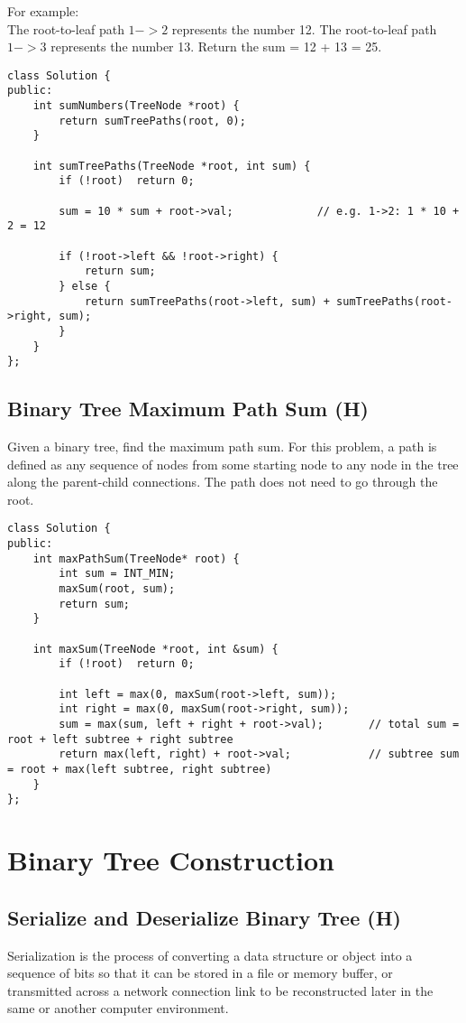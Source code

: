 For example: \\
The root-to-leaf path $1->2$ represents the number 12. The root-to-leaf path $1->3$ represents the number 13. Return the sum = 12 + 13 = 25. \\

\begin{lstlisting}
class Solution {
public:
    int sumNumbers(TreeNode *root) {
        return sumTreePaths(root, 0);
    }
    
    int sumTreePaths(TreeNode *root, int sum) {
        if (!root)  return 0;
        
        sum = 10 * sum + root->val;             // e.g. 1->2: 1 * 10 + 2 = 12
        
        if (!root->left && !root->right) {
            return sum;
        } else {
            return sumTreePaths(root->left, sum) + sumTreePaths(root->right, sum);
        }
    }
};
\end{lstlisting}


\subsection{Binary Tree Maximum Path Sum (H)}
Given a binary tree, find the maximum path sum. For this problem, a path is defined as any sequence of nodes from some starting node to any node in the tree along the parent-child connections. The path does not need to go through the root. \\

\begin{lstlisting}
class Solution {
public:
    int maxPathSum(TreeNode* root) {
        int sum = INT_MIN;
        maxSum(root, sum);
        return sum;
    }
    
    int maxSum(TreeNode *root, int &sum) {
        if (!root)  return 0;
        
        int left = max(0, maxSum(root->left, sum));
        int right = max(0, maxSum(root->right, sum));
        sum = max(sum, left + right + root->val);       // total sum = root + left subtree + right subtree
        return max(left, right) + root->val;            // subtree sum = root + max(left subtree, right subtree)
    }
};
\end{lstlisting}


\section{Binary Tree Construction}
\subsection{Serialize and Deserialize Binary Tree (H)}
Serialization is the process of converting a data structure or object into a sequence of bits so that it can be stored in a file or memory buffer, or transmitted across a network connection link to be reconstructed later in the same or another computer environment.\\

